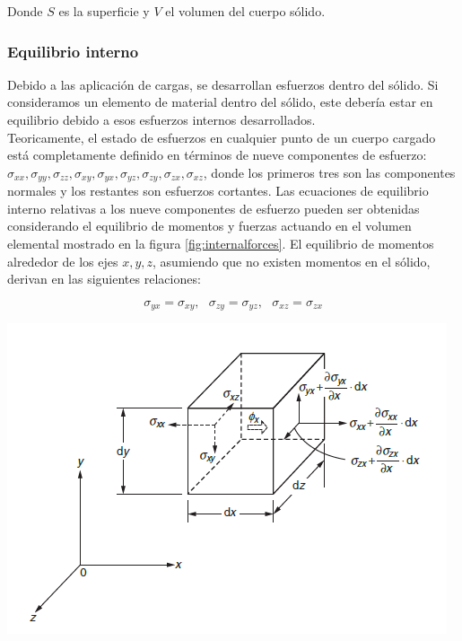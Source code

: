 Donde $S$ es la superficie y $V$ el volumen del cuerpo sólido.


\subsubsection{Equilibrio interno}

Debido a las aplicación de cargas, se desarrollan esfuerzos dentro del sólido. Si consideramos 
un elemento de material dentro del sólido, este debería estar en equilibrio debido a esos 
esfuerzos internos desarrollados.\\

Teoricamente, el estado de esfuerzos en cualquier punto de un cuerpo cargado está completamente definido 
en términos de nueve componentes de esfuerzo: $\sigma_{xx}, \sigma_{yy}, \sigma_{zz}, \sigma_{xy}, \sigma_{yx}, 
\sigma_{yz}, \sigma_{zy}, \sigma_{zx}, \sigma_{xz} $, donde los primeros tres son las componentes normales y los restantes 
son esfuerzos cortantes. Las ecuaciones de equilibrio interno relativas a los nueve componentes de esfuerzo pueden ser 
obtenidas considerando el equilibrio de momentos y fuerzas actuando en el volumen elemental mostrado en 
la figura \ref{fig:internalforces}. El equilibrio de momentos alrededor de los ejes $x,y,z$, asumiendo que no existen 
momentos en el sólido, derivan en las siguientes relaciones:

\begin{equation}
\sigma_{yx} = \sigma_{xy}, \,\,\,\, \sigma_{zy} = \sigma_{yz}, \,\,\,\, \sigma_{xz} = \sigma_{zx}
\end{equation}

\begin{center}
\includegraphics[scale]{src/ch2/internal_force.png}
\label{fig:internalforces}
\end{center}


